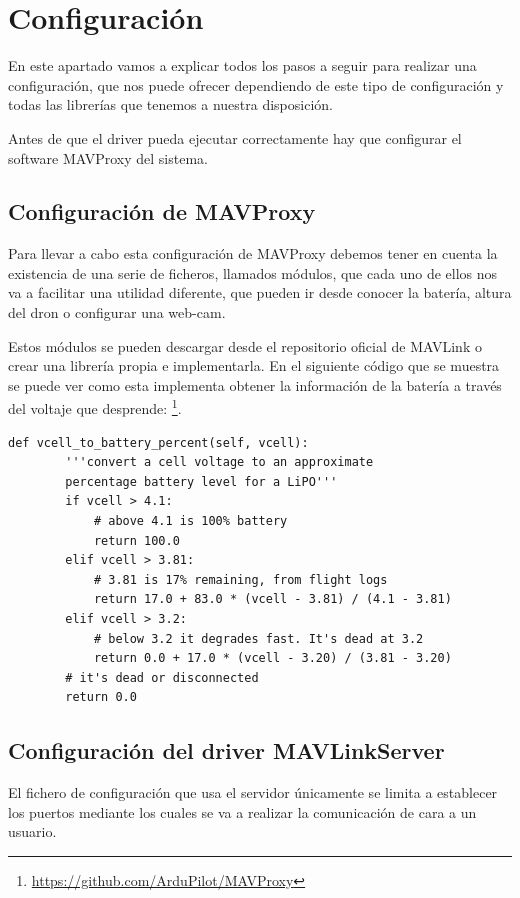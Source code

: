 \section{Configuración}

En este apartado vamos a explicar todos los pasos a seguir para realizar una configuración, que nos puede ofrecer dependiendo de este tipo de configuración y todas las librerías que tenemos a nuestra disposición.

Antes de que el driver pueda ejecutar correctamente hay que configurar el software MAVProxy del sistema.


\subsection{Configuración de MAVProxy}
\label{Pre-Configuracion}


Para llevar a cabo esta configuración de MAVProxy debemos tener en cuenta la existencia de una serie de ficheros, llamados módulos, que cada uno de ellos nos va a facilitar una utilidad diferente, que pueden ir desde conocer la batería, altura del dron o configurar una web-cam.

Estos módulos se pueden descargar desde el repositorio oficial de MAVLink o crear una librería propia e implementarla. En el siguiente código que se muestra se puede ver como esta implementa obtener la información de la batería a través del voltaje que desprende:
\footnote{\url{https://github.com/ArduPilot/MAVProxy}}.

\begin{lstlisting}[frame=single]
    def vcell_to_battery_percent(self, vcell):
        '''convert a cell voltage to an approximate
        percentage battery level for a LiPO'''
        if vcell > 4.1:
            # above 4.1 is 100% battery
            return 100.0
        elif vcell > 3.81:
            # 3.81 is 17% remaining, from flight logs
            return 17.0 + 83.0 * (vcell - 3.81) / (4.1 - 3.81)
        elif vcell > 3.2:
            # below 3.2 it degrades fast. It's dead at 3.2
            return 0.0 + 17.0 * (vcell - 3.20) / (3.81 - 3.20)
        # it's dead or disconnected
        return 0.0
\end{lstlisting}

\subsection{Configuración del driver MAVLinkServer}

El fichero de configuración que usa el servidor únicamente se limita a establecer los puertos mediante los cuales se va a realizar la comunicación de cara a un usuario.


